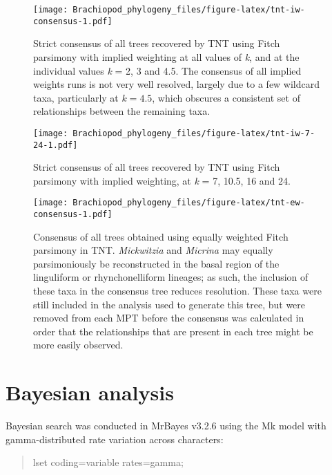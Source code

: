\documentclass[openany]{book}
\theoremstyle{definition}
\theoremstyle{definition}
\theoremstyle{definition}
\theoremstyle{remark}
\begin{document}
\begin{figure}
\centering
\texttt{[image: Brachiopod\_phylogeny\_files/figure-latex/tnt-iw-consensus-1.pdf]}
\caption{\label{fig:tnt-iw-consensus}Strict consensus of all trees recovered by TNT
using Fitch parsimony with implied weighting at all values of \emph{k}, and at the individual
values \emph{k} = 2, 3 and 4.5.
The consensus of all implied weights runs is
not very well resolved, largely due to a few wildcard taxa, particularly
at \(k = 4.5\), which obscures a consistent set of relationships between
the remaining taxa.}
\end{figure}

\begin{figure}
\centering
\texttt{[image: Brachiopod\_phylogeny\_files/figure-latex/tnt-iw-7-24-1.pdf]}
\caption{\label{fig:tnt-iw-7-24}Strict consensus of all trees recovered by TNT
using Fitch parsimony with implied weighting, at \emph{k} = 7, 10.5, 16 and 24.}
\end{figure}

\newpage










\begin{figure}
\centering
\texttt{[image: Brachiopod\_phylogeny\_files/figure-latex/tnt-ew-consensus-1.pdf]}
\caption{\label{fig:tnt-ew-consensus}Consensus of all trees obtained using equally weighted
Fitch parsimony in TNT. \emph{Mickwitzia} and \emph{Micrina} may equally
parsimoniously be reconstructed in the basal region of the linguliform
or rhynchonelliform lineages; as such, the inclusion of these taxa in
the consensus tree reduces resolution. These taxa were still included in
the analysis used to generate this tree, but were removed from each MPT
before the consensus was calculated in order that the relationships that
are present in each tree might be more easily observed.}
\end{figure}

\hypertarget{bayesian}{\chapter{Bayesian analysis}\label{bayesian}}

Bayesian search was conducted in MrBayes v3.2.6 \citep{Ronquist2012}
using the Mk model \citep{Lewis2001} with gamma-distributed rate
variation across characters:

\begin{quote}
lset coding=variable rates=gamma;
\end{quote}
\end{document}
